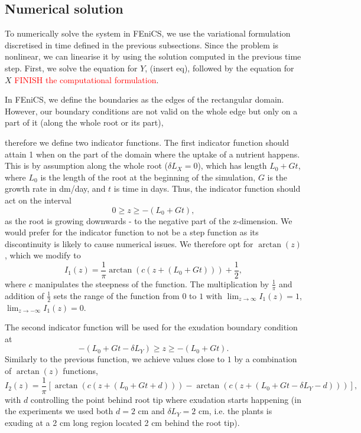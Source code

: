 \documentclass[11pt]{article}
\numberwithin{equation}{section}
\begin{document}

\subsection{Numerical solution}
To numerically solve the system in FEniCS, we use the variational formulation discretised in time defined in the previous subsections. Since the problem is nonlinear, we can linearise it by using the solution computed in the previous time step. First, we solve the equation for $Y$, (insert eq), followed by the equation for $X$ \textcolor{red}{FINISH the computational formulation}.

In FEniCS, we define the boundaries as the edges of the rectangular domain. However, our boundary conditions are not valid on the whole edge but only on a part of it (along the whole root or its part), 

therefore we define two indicator functions. The first indicator function should attain 1 when on the part of the domain where the uptake of a nutrient happens. This is by assumption along the whole root ($\delta L_X =0$), which has length $L_0 + Gt$, where $L_0$ is the length of the root at the beginning of the simulation, $G$ is the growth rate in dm/day, and $t$ is time in days. Thus, the indicator function should act on the interval $$0 \geq z \geq -(L_0 + Gt),$$ as the root is growing downwards - to the negative part of the z-dimension. We would prefer for the indicator function to not be a step function as its discontinuity is likely to cause numerical issues. We therefore opt for $\arctan(z)$, which we modify to 
\begin{equation}
    I_1 (z) = \frac{1}{\pi} \arctan(c (z+(L_0 + Gt))) + \frac{1}{2},
\end{equation}
where $c$ manipulates the steepness of the function. The multiplication by $\frac{1}{\pi}$ and addition of $\frac{1}{2}$ sets the range of the function from $0$ to $1$ with $\lim_{z \to \infty} I_1(z) = 1$, $\lim_{z \to -\infty} I_1(z) = 0$.

The second indicator function will be used for the exudation boundary condition at $$-(L_0 + Gt - \delta L_Y) \geq z \geq -(L_0 + Gt).$$ Similarly to the previous function, we achieve values close to $1$ by a combination of $\arctan(z)$ functions,
\begin{equation}
    I_2 (z) = \frac{1}{\pi} [ \arctan(c (z+(L_0 + Gt + d))) - \arctan(c (z+(L_0 + Gt -\delta L_Y - d))) ],
\end{equation}
with $d$ controlling the point behind root tip where exudation starts happening (in the experiments we used both $d = 2$ cm and $\delta L_Y = 2$ cm, i.e. the plants is exuding at a 2 cm long region located 2 cm behind the root tip).
\end{document}
